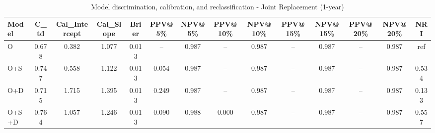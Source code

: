 \begin{table}[htbp]
\centering
\small
\caption{Model discrimination, calibration, and reclassification - Joint Replacement (1-year)}
\label{tab:perf_joint_1y}
\begin{tabular}{lccccccccccccc}
\toprule
Model & C\_td & Cal\_Intercept & Cal\_Slope & Brier & PPV@5\% & NPV@5\% & PPV@10\% & NPV@10\% & PPV@15\% & NPV@15\% & PPV@20\% & NPV@20\% & NRI \\
\midrule
O & 0.678 & 0.382 & 1.077 & 0.013 & -- & 0.987 & -- & 0.987 & -- & 0.987 & -- & 0.987 & ref \\
O+S & 0.747 & 0.558 & 1.122 & 0.013 & 0.054 & 0.987 & -- & 0.987 & -- & 0.987 & -- & 0.987 & 0.534 \\
O+D & 0.715 & 1.715 & 1.395 & 0.013 & 0.249 & 0.987 & -- & 0.987 & -- & 0.987 & -- & 0.987 & 0.133 \\
O+S+D & 0.764 & 1.057 & 1.246 & 0.013 & 0.090 & 0.988 & 0.000 & 0.987 & -- & 0.987 & -- & 0.987 & 0.557 \\
\bottomrule
\end{tabular}
\end{table}